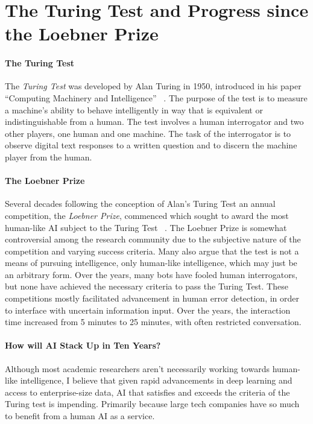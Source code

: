 \documentclass[12pt]{article}
\begin{document}
\maketitle

\section{The Turing Test and Progress since the Loebner Prize}
\paragraph{The Turing Test}
The \textit{Turing Test} was developed by Alan Turing in 1950, introduced in his paper ``Computing Machinery and Intelligence'' ~\cite{turing}. The purpose of the test is to measure a machine's ability to behave intelligently in way that is equivalent or indistinguishable from a human. The test involves a human interrogator and two other players, one human and one machine. The task of the interrogator is to observe digital text responses to a written question and to discern the machine player from the human.
\paragraph{The Loebner Prize}
Several decades following the conception of Alan's Turing Test an annual competition, the \textit{Loebner Prize}, commenced which sought to award the most human-like AI subject to the Turing Test ~\cite{loebner}. The Loebner Prize is somewhat controversial among the research community due to the subjective nature of the competition and varying success criteria. Many also argue that the test is not a means of pursuing intelligence, only human-like intelligence, which may just be an arbitrary form. Over the years, many bots have fooled human interrogators, but none have achieved the necessary criteria to pass the Turing Test. These competitions mostly facilitated advancement in human error detection, in order to interface with uncertain information input. Over the years, the interaction time increased from 5 minutes to  25 minutes, with often restricted conversation.
\paragraph{How will AI Stack Up in Ten Years?}
Although most academic researchers aren't necessarily working towards human-like intelligence, I believe that given rapid advancements in deep learning and access to enterprise-size data, AI that satisfies and exceeds the criteria of the Turing test is impending. Primarily because large tech companies have so much to benefit from a human AI as a service.
\end{document}

